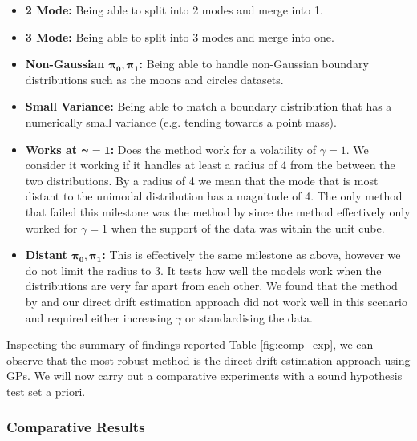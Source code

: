 \documentclass[a4paper,12pt,twoside,openright]{report}
\theoremstyle{definition}
\begin{document}
\begin{itemize}
    \item \textbf{ 2 Mode:} Being able to split into 2 modes and merge into 1.
    \item \textbf{ 3 Mode:} Being able to split into 3 modes and merge into one.
    \item \textbf{Non-Gaussian $\bm{\pi_0,\pi_1}$:} Being able to handle non-Gaussian boundary distributions such as the moons and circles datasets. 
    \item \textbf{Small Variance:} Being able to match a boundary distribution that has a numerically small variance (e.g. tending towards a point mass).  
    \item \textbf{Works at $\bm{\gamma=1}$:} Does the method work for a volatility of $\gamma=1$. We consider it working if it handles at least  a radius of 4 from the between the two distributions. By a radius of 4 we mean that the mode that is most distant to the unimodal distribution has a magnitude of 4. The only method that failed this milestone was the method by \cite{pavon2018data} since the method effectively only worked for $\gamma=1$ when the support of the data was within the unit cube.
    \item \textbf{Distant $\bm{\pi_0, \pi_1}$:} This is effectively the same milestone as above, however we do not limit the radius to 3. It tests how well the models work when the distributions are very far apart from each other. We found that the method by \cite{pavon2018data} and our direct drift estimation approach did not work well in this scenario and required either increasing $\gamma$ or standardising the data.
\end{itemize}

Inspecting the summary of findings reported Table \ref{fig:comp_exp}, we can observe that the most robust method is the direct drift estimation approach using GPs. We will now carry out a comparative experiments with a sound hypothesis test set a priori. 

\subsubsection{Comparative Results}
\end{document}
